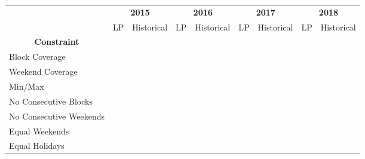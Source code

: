 \begin{table}[htbp]
	\centering
	\begin{adjustbox}{angle=90, scale=0.9}
		\begin{tabular}{l|cc|cc|cc|cc}
			\multirow{2}[1]{*}{}                                & \multicolumn{2}{c|}{\textbf{2015}} & \multicolumn{2}{c|}{\textbf{2016}} & \multicolumn{2}{c|}{\textbf{2017}} & \multicolumn{2}{c}{\textbf{2018}} \\
			                                                    &     LP     &      Historical       &     LP     &      Historical       &     LP     &      Historical       &     LP     &      Historical      \\ \midrule
			\multicolumn{1}{c|}{\textbf{Constraint}}            &            &                       &            &                       &            &                       &            &                      \\ \midrule
			Block Coverage                                      & \checkmark &      \checkmark       & \checkmark &      \checkmark       & \checkmark &      \checkmark       & \checkmark &      \checkmark      \\
			Weekend Coverage                                    & \checkmark &      \checkmark       & \checkmark &      \checkmark       & \checkmark &      \checkmark       & \checkmark &      \checkmark      \\
			Min/Max                                             & \checkmark &      \checkmark       & \checkmark &      \checkmark       & \checkmark &      \checkmark       & \checkmark &      \checkmark      \\
			No Consecutive Blocks                               & \checkmark &                       & \checkmark &                       & \checkmark &                       & \checkmark &                      \\
			No Consecutive Weekends                             & \checkmark &                       & \checkmark &                       & \checkmark &      \checkmark       & \checkmark &      \checkmark      \\
			Equal Weekends                                      & \checkmark &                       & \checkmark &                       & \checkmark &                       & \checkmark &                      \\
			Equal Holidays                                      & \checkmark &                       & \checkmark &      \checkmark       & \checkmark &                       & \checkmark &      \checkmark      \\ \midrule

\end{tabular}
\end{adjustbox}
\end{table}
